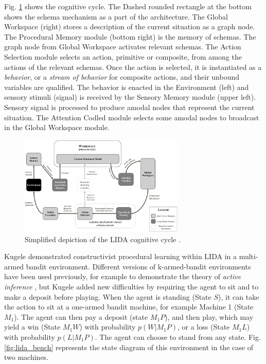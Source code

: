 \documentclass[runningheads]{llncs}
\begin{document}
Fig. \ref{fig:lida} shows the cognitive cycle. 
The Dashed rounded rectangle at the bottom shows the schema mechanism as a part of the architecture. 
The Global Workspace (right) stores a description of the current situation as a graph node. 
The Procedural Memory module (bottom right) is the memory of schemas. 
The graph node from Global Workspace activates relevant schemas. 
The Action Selection module selects an action, primitive or composite, from among the actions of the relevant schemas. 
Once the action is selected, it is instantiated as a \textit{behavior}, or a \textit{stream of behavior} for composite actions, and their unbound variables are qualified. 
The behavior is enacted in the Environment (left) and sensory stimuli (signal) is received by the Sensory Memory module (upper left).
Sensory signal is processed to produce amodal nodes that represent the current situation. 
The Attention Codled module selects some amodal nodes to broadcast in the Global Workspace module. 

\begin{figure}
	\centering
	\includegraphics[width=0.7\textwidth]{Figure_LIDA.png}
	\caption{Simplified depiction of the LIDA cognitive cycle \cite[Fig. 4]{kugele_constructivist_2025}.
	} 
	\label{fig:lida}
\end{figure}

Kugele \cite{kugele_constructivist_2025} demonstrated constructivist procedural learning within LIDA in a multi-armed bandit environment.
Different versions of k-armed-bandit environments have been used previously, for example to demonstrate the theory of \textit{active inference} \cite{smith_step-by-step_2022}, 
but Kugele added new difficulties by requiring the agent to sit and to make a deposit before playing.  
When the agent is standing (State $S$), it can take the action to sit at a one-armed bandit machine, for example Machine 1 (State $M_1$).
The agent can then pay a deposit (state $M_1P$), and then play, which may yield a win (State $M_1W$) with probability $p(W|M_1P)$, or a loss (State $M_1L$) with probability $p(L|M_1P)$. The agent can choose to stand from any state.
Fig. \ref{fig:lida_bench} represents the state diagram of this environment in the case of two machines. 
\end{document}
